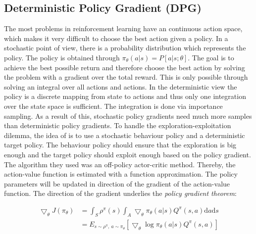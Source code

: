 \subsection{Deterministic Policy Gradient (DPG)}
\label{sec:DPG}
\nocite{lillicrap2015continuous}
The most problems in reinforcement learning have an continuous action space, 
which makes it very difficult to choose the best action given a policy. In a 
stochastic point of view, there is a probability distribution which represents 
the policy. The policy is obtained through $\pi_\theta(a|s) =P[a|s;\theta]$. 
The goal is to achieve the best possible return and therefore choose the best 
action by solving the problem with a gradient over the total reward. This is 
only possible through solving an integral over all actions and actions. In the 
deterministic view the policy is a discrete mapping from state to actions and 
thus only one integration over the state space is sufficient. The integration 
is done via importance sampling. As a result of 
this, stochastic policy gradients need much more samples than deterministic 
policy gradients. To handle the exploration-exploitation dilemma, the idea of 
\citeauthor{silver2014deterministic} is to use a stochastic behaviour policy  
and a deterministic target policy. The behaviour policy should ensure that the 
exploration is big enough and the target policy should exploit enough based on 
the policy gradient. The algorithm they used was an off-policy actor-critic 
method. Thereby, the action-value function is estimated with a function 
approximation. The policy parameters will be updated in direction of the 
gradient of the action-value function. The direction of the gradient underlies 
the \textit{policy gradient theorem}: 

\begin{align*}
\bigtriangledown_\theta 
J(\pi_\theta)&=\int_{S}^{}\rho^\pi(s)\int_{A}\bigtriangledown_\theta 
\pi_\theta(a|s)Q^\pi(s,a)\mathrm{d}a\mathrm{d}s\\
&=E_{s \sim \rho^\pi,\: a\sim\pi_\theta}[\bigtriangledown_\theta \log 
\pi_\theta (a|s)Q^\pi(s,a)]
\end{align*}%


